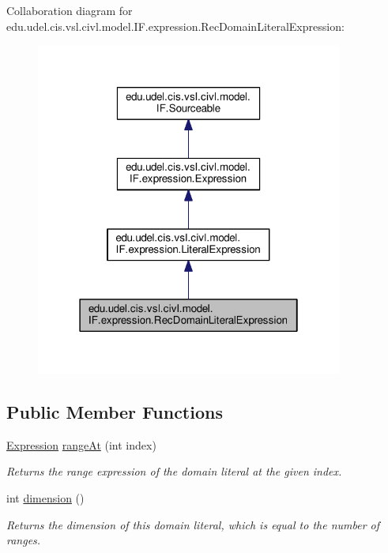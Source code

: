Collaboration diagram for edu.\+udel.\+cis.\+vsl.\+civl.\+model.\+I\+F.\+expression.\+Rec\+Domain\+Literal\+Expression\+:
\nopagebreak
\begin{figure}[H]
\begin{center}
\leavevmode
\includegraphics[width=286pt]{interfaceedu_1_1udel_1_1cis_1_1vsl_1_1civl_1_1model_1_1IF_1_1expression_1_1RecDomainLiteralExpression__coll__graph}
\end{center}
\end{figure}
\subsection*{Public Member Functions}
\begin{DoxyCompactItemize}
\item 
\hyperlink{interfaceedu_1_1udel_1_1cis_1_1vsl_1_1civl_1_1model_1_1IF_1_1expression_1_1Expression}{Expression} \hyperlink{interfaceedu_1_1udel_1_1cis_1_1vsl_1_1civl_1_1model_1_1IF_1_1expression_1_1RecDomainLiteralExpression_aed523ebea709315fd53f0612c9970c3a}{range\+At} (int index)
\begin{DoxyCompactList}\small\item\em Returns the range expression of the domain literal at the given index. \end{DoxyCompactList}\item 
int \hyperlink{interfaceedu_1_1udel_1_1cis_1_1vsl_1_1civl_1_1model_1_1IF_1_1expression_1_1RecDomainLiteralExpression_a3570f96ba4cf7d2757953b09e5a1f7a5}{dimension} ()
\begin{DoxyCompactList}\small\item\em Returns the dimension of this domain literal, which is equal to the number of ranges. \end{DoxyCompactList}\end{DoxyCompactItemize}


